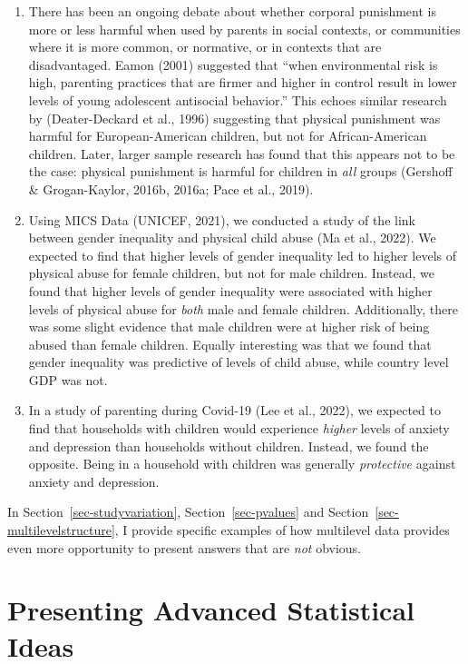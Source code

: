 \documentclass[
  letterpaper,
  DIV=11,
  numbers=noendperiod]{scrreprt}
\providecommand{\tightlist}{%
  \setlength{\itemsep}{0pt}\setlength{\parskip}{0pt}}\usepackage{longtable,booktabs,array}
\begin{document}
\begin{enumerate}
\def\labelenumi{\arabic{enumi}.}
\tightlist
\item
  There has been an ongoing debate about whether corporal punishment is
  more or less harmful when used by parents in social contexts, or
  communities where it is more common, or normative, or in contexts that
  are disadvantaged. Eamon (2001) suggested that ``when environmental
  risk is high, parenting practices that are firmer and higher in
  control result in lower levels of young adolescent antisocial
  behavior.'' This echoes similar research by (Deater-Deckard et al.,
  1996) suggesting that physical punishment was harmful for
  European-American children, but not for African-American children.
  Later, larger sample research has found that this appears not to be
  the case: physical punishment is harmful for children in \emph{all}
  groups (Gershoff \& Grogan-Kaylor, 2016b, 2016a; Pace et al., 2019).
\item
  Using MICS Data (UNICEF, 2021), we conducted a study of the link
  between gender inequality and physical child abuse (Ma et al., 2022).
  We expected to find that higher levels of gender inequality led to
  higher levels of physical abuse for female children, but not for male
  children. Instead, we found that higher levels of gender inequality
  were associated with higher levels of physical abuse for \emph{both}
  male and female children. Additionally, there was some slight evidence
  that male children were at higher risk of being abused than female
  children. Equally interesting was that we found that gender inequality
  was predictive of levels of child abuse, while country level GDP was
  not.
\item
  In a study of parenting during Covid-19 (Lee et al., 2022), we
  expected to find that households with children would experience
  \emph{higher} levels of anxiety and depression than households without
  children. Instead, we found the opposite. Being in a household with
  children was generally \emph{protective} against anxiety and
  depression.
\end{enumerate}

In Section~\ref{sec-studyvariation}, Section~\ref{sec-pvalues} and
Section~\ref{sec-multilevelstructure}, I provide specific examples of
how multilevel data provides even more opportunity to present answers
that are \emph{not} obvious.

\section{Presenting Advanced Statistical
Ideas}\label{presenting-advanced-statistical-ideas}
\end{document}
